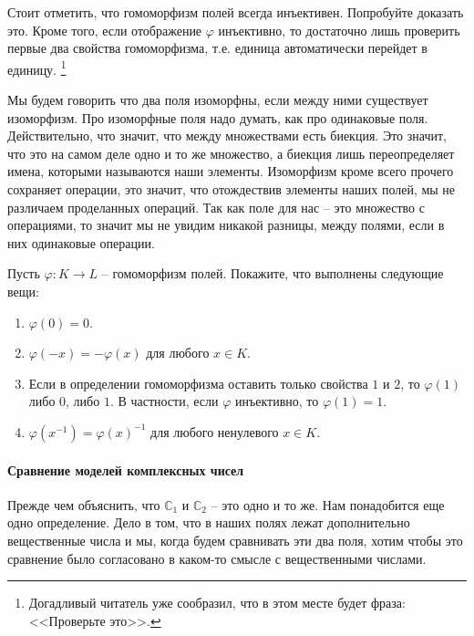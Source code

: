Стоит отметить, что гомоморфизм полей всегда инъективен.
Попробуйте доказать это.
Кроме того, если отображение $\varphi$ инъективно, то достаточно лишь проверить первые два свойства гомоморфизма, т.е. единица автоматически перейдет в единицу.%
\footnote{Догадливый читатель уже сообразил, что в этом месте будет фраза: <<Проверьте это>>.}

Мы будем говорить что два поля изоморфны, если между ними существует изоморфизм.
Про изоморфные поля надо думать, как про одинаковые поля.
Действительно, что значит, что между множествами есть биекция.
Это значит, что это на самом деле одно и то же множество, а биекция лишь переопределяет имена, которыми называются наши элементы.
Изоморфизм кроме всего прочего сохраняет операции, это значит, что отождествив элементы наших полей, мы не различаем проделанных операций.
Так как поле для нас -- это множество с операциями, то значит мы не увидим никакой разницы, между полями, если в них одинаковые операции.

\begin{problems}
Пусть $\varphi\colon K\to L$ -- гомоморфизм полей.
Покажите, что выполнены следующие вещи:
\begin{enumerate}
\item $\varphi(0) = 0$.

\item $\varphi(-x) = -\varphi(x)$ для любого $x\in K$.

\item Если в определении гомоморфизма оставить только свойства $1$ и $2$, то $\varphi(1)$ либо $0$, либо $1$.
В частности, если $\varphi$ инъективно, то $\varphi(1) = 1$.

\item $\varphi(x^{-1}) = \varphi(x)^{-1}$ для любого ненулевого $x\in K$.
\end{enumerate}
\end{problems}

\paragraph{Сравнение моделей комплексных чисел}

Прежде чем объяснить, что $\mathbb C_1$ и $\mathbb C_2$ -- это одно и то же.
Нам понадобится еще одно определение.
Дело в том, что в наших полях лежат дополнительно вещественные числа и мы, когда будем сравнивать эти два поля, хотим чтобы это сравнение было согласовано в каком-то смысле с вещественными числами.

